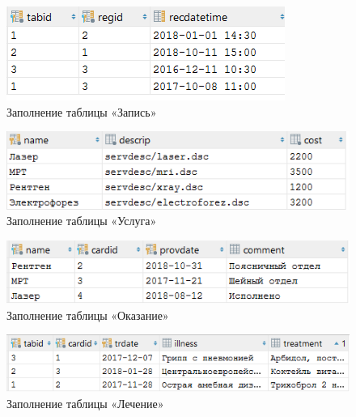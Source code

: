 \documentclass[14pt,a4paper,russian]{extreport}
\begin{document}
\vspace{0.00mm}

\begin{figure}[h]
        \center\includegraphics[scale=1]{appointment}
        \caption{Заполнение таблицы «Запись»}
        \label{fig:appointment}
\end{figure}

\vspace{0.00mm}

\cleardoublepage
\begin{figure}[!h]
        \center\includegraphics[scale=1]{service}
        \caption{Заполнение таблицы «Услуга»}
        \label{fig:service}
\end{figure}

\vspace{0.00mm}

\begin{figure}[h!]
        \center\includegraphics[scale=1]{serviceprovision}
        \caption{Заполнение таблицы «Оказание»}
        \label{fig:serviceprovision}
\end{figure}

\vspace{0.00mm}

\begin{figure}[h!]
        \center\includegraphics[scale=1]{treatment}
        \caption{Заполнение таблицы «Лечение»}
        \label{fig:treatment}
\end{figure}
\vfill
\phantom{0000}
\end{document}
